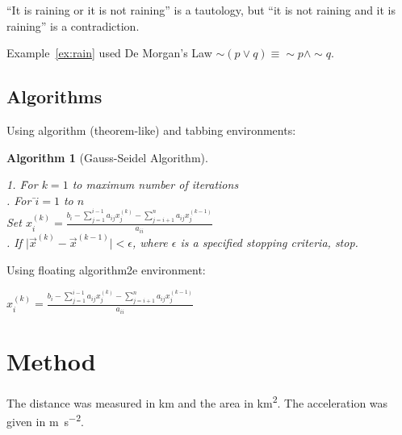 \documentclass[oneside,12pt]{scrbook}
\theoremstyle{break}
\newtheorem{algorithm}[algocf]{Algorithm}
\begin{document}
\begin{Example}\label{ex:rain}
``It is raining or it is not raining'' is a tautology,
but ``it is not raining and it is raining'' is a contradiction.
\end{Example}

\begin{Remark}
Example~\ref{ex:rain} used De Morgan’s Law
$\sim (p \vee q) \equiv \sim p \wedge \sim q$.
\end{Remark}

\section{Algorithms}

Using algorithm (theorem-like) and tabbing environments:

\begin{algorithm}[Gauss-Seidel Algorithm]
\begin{tabbing}
1. \=For $k=1$ to maximum number of iterations\\
. For \=$i=1$ to $n$\\
\>\>Set
\begin{math}
x_i^{(k)} =
\frac{b_i-\sum_{j=1}^{i-1}a_{ij}x_j^{(k)}
-\sum_{j=i+1}^{n}a_{ij}x_j^{(k-1)}}%
{a_{ii}}
\end{math}
\\
. If $\lvert\vec{x}^{(k)}-\vec{x}^{(k-1)}\rvert < \epsilon$,
where $\epsilon$ is a specified stopping criteria, stop.
\end{tabbing}
\end{algorithm}

Using floating algorithm2e environment:

\begin{algorithm2e}
\caption{Gauss-Seidel Algorithm}\label{alg:gauss-seidel}
{
   {
     $
      x_i^{(k)} =
      \frac{b_i-\sum_{j=1}^{i-1}a_{ij}x_j^{(k)}
      -\sum_{j=i+1}^{n}a_{ij}x_j^{(k-1)}}%
      {a_{ii}}
      $\;
   }
}
\end{algorithm2e}


\chapter{Method}
\label{ch:method}

The distance was measured in \si{\kilo\metre} and the area in
\si{\kilo\metre\squared}. The acceleration was given in
\si{\metre\per\square\second}.
\end{document}
